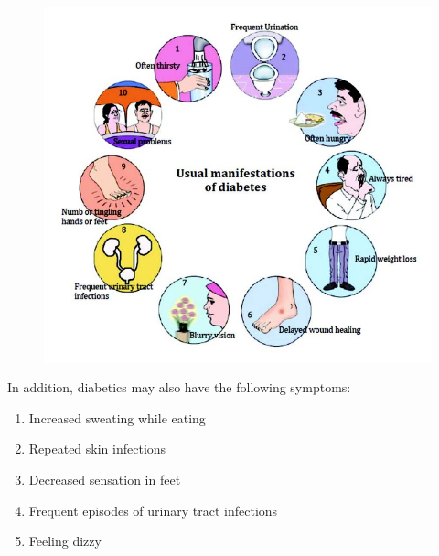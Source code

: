 \begin{figure}[h]
\centering
\includegraphics[scale=2.3]{images/023.jpg}
\end{figure}

In addition, diabetics may also have the following symptoms:

\vspace{-\topsep}
\begin{enumerate}[\ding{226}]
\itemsep=0pt
\item Increased sweating while eating
\item Repeated skin infections
\item Decreased sensation in feet
\item Frequent episodes of urinary tract infections
\item Feeling dizzy
 \end{enumerate}
 \vspace{-\topsep}

